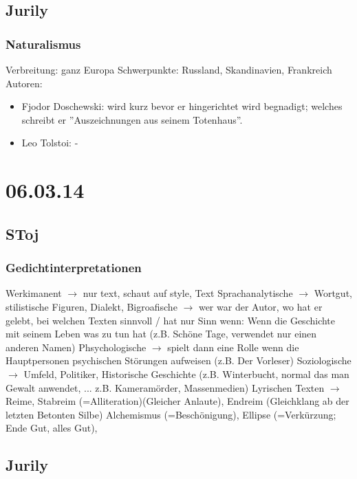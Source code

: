 \documentclass[a4paper]{article}
\begin{document}
\subsection{Jurily}

\subsubsection{Naturalismus}

Verbreitung: ganz Europa
Schwerpunkte: Russland, Skandinavien, Frankreich
Autoren: 
\begin{itemize}
\item Fjodor Doschewski: wird kurz bevor er hingerichtet wird begnadigt; welches schreibt er ''Auszeichnungen aus seinem Totenhaus''. 
\item Leo Tolstoi: -
\end{itemize}

\section{06.03.14}

\subsection{SToj}

\subsubsection{Gedichtinterpretationen}

Werkimanent $\rightarrow$ nur text, schaut auf style, Text
Sprachanalytische $\rightarrow$ Wortgut, stilistische Figuren, Dialekt,
Bigroafische $\rightarrow$ wer war der Autor, wo hat er gelebt, bei welchen Texten sinnvoll / hat nur Sinn wenn: Wenn die Geschichte mit seinem Leben was zu tun hat (z.B. Schöne Tage, verwendet nur einen anderen Namen)
Phsychologische $\rightarrow$ spielt dann eine Rolle wenn die Hauptpersonen psychischen Störungen aufweisen (z.B. Der Vorleser)
Soziologische $\rightarrow$ Umfeld, Politiker, Historische Geschichte (z.B. Winterbucht, normal das man Gewalt anwendet, ... z.B. Kameramörder, Massenmedien)
\newline
Lyrischen Texten $\rightarrow$ Reime, Stabreim (=Alliteration)(Gleicher Anlaute), Endreim (Gleichklang ab der letzten Betonten Silbe)
Alchemismus (=Beschönigung), Ellipse (=Verkürzung; Ende Gut, alles Gut), 

\subsection{Jurily}
\end{document}
